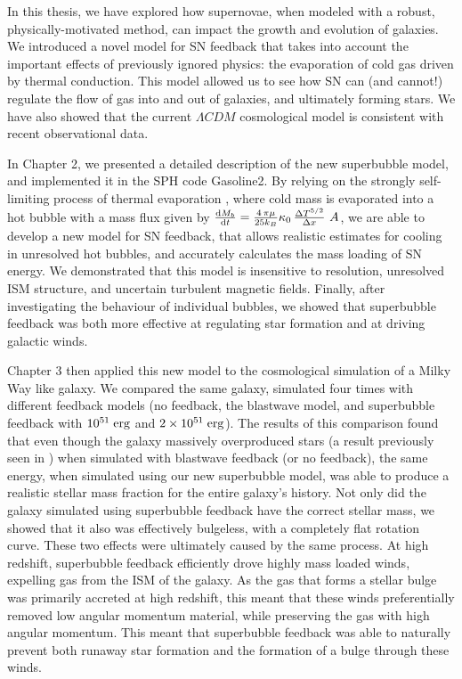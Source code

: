 In this thesis, we have explored how supernovae, when modeled with a robust,
physically-motivated method, can impact the growth and evolution of galaxies.
We introduced a novel model for SN feedback that takes into account the
important effects of previously ignored physics: the evaporation of cold gas
driven by thermal conduction.  This model allowed us to see how SN can (and
cannot!) regulate the flow of gas into and out of galaxies, and ultimately
forming stars.  We have also showed that the current $\Lambda CDM$ cosmological
model is consistent with recent observational data.

In Chapter 2, we presented a detailed description of the new superbubble model,
and implemented it in the SPH code {\sc Gasoline2}.  By relying on the strongly
self-limiting process of thermal evaporation \citep{Cowie1977}, where cold mass is evaporated into
a hot bubble with a mass flux given by $ \frac{{\rm d }M_b}{{\rm d}t} =
\frac{4\,\pi\mu}{25k_B}\kappa_0\,\frac{\Delta T^{5/2}}{\Delta x}\ A$, we are
able to develop a new model for SN feedback, that allows realistic estimates for
cooling in unresolved hot bubbles, and accurately calculates the mass loading of
SN energy.  We demonstrated that this model is insensitive to resolution,
unresolved ISM structure, and uncertain turbulent magnetic fields.  Finally,
after investigating the behaviour of individual bubbles, we showed that
superbubble feedback was both more effective at regulating star formation and at
driving galactic winds.

Chapter 3 then applied this new model to the cosmological simulation of a Milky
Way like galaxy.  We compared the same galaxy, simulated four times with
different feedback models (no feedback, the \citet{Stinson2006} blastwave model,
and superbubble feedback with $10^{51}\;\rm{erg}$ and
$2\times10^{51}\;\rm{erg}$).  The results of this comparison found that even
though the galaxy massively overproduced stars (a result previously seen in
\citealt{Stinson2010}) when simulated with blastwave feedback (or no feedback),
the same energy, when simulated using our new superbubble model, was able to
produce a realistic stellar mass fraction for the entire galaxy's history.  Not
only did the galaxy simulated using superbubble feedback have the correct
stellar mass, we showed that it also was effectively bulgeless, with a
completely flat rotation curve.  These two effects were ultimately caused by the
same process.  At high redshift, superbubble feedback efficiently drove highly
mass loaded winds, expelling gas from the ISM of the galaxy.  As the gas that
forms a stellar bulge was primarily accreted at high redshift, this meant that
these winds preferentially removed low angular momentum material, while
preserving the gas with high angular momentum.  This meant that superbubble
feedback was able to naturally prevent both runaway star formation and the
formation of a bulge through these winds.


